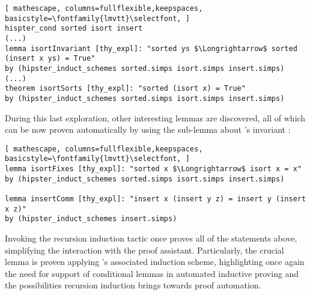 \begin{lstlisting}[ mathescape, columns=fullflexible,keepspaces, basicstyle=\fontfamily{lmvtt}\selectfont, ]
hispter_cond sorted isort insert
(...)
lemma isortInvariant [thy_expl]: "sorted ys $\Longrightarrow$ sorted (insert x ys) = True"
by (hipster_induct_schemes sorted.simps isort.simps insert.simps)
(...)
theorem isortSorts [thy_expl]: "sorted (isort x) = True"
by (hipster_induct_schemes sorted.simps isort.simps insert.simps)
\end{lstlisting}

During this last exploration, other interesting lemmas are discovered, all of which can be now proven automatically by using the sub-lemma about 's invariant :

\begin{lstlisting}[ mathescape, columns=fullflexible,keepspaces, basicstyle=\fontfamily{lmvtt}\selectfont, ]
lemma isortFixes [thy_expl]: "sorted x $\Longrightarrow$ isort x = x"
by (hipster_induct_schemes sorted.simps isort.simps insert.simps)

lemma insertComm [thy_expl]: "insert x (insert y z) = insert y (insert x z)"
by (hipster_induct_schemes insert.simps)
\end{lstlisting}

Invoking the recursion induction tactic  once proves all of the statements above, simplifying the interaction with the proof assistant.
%
Particularly, the crucial lemma  is proven applying 's associated induction scheme, highlighting once again the need for support of conditional lemmas in automated inductive proving and the possibilities recursion induction brings towards proof automation.


